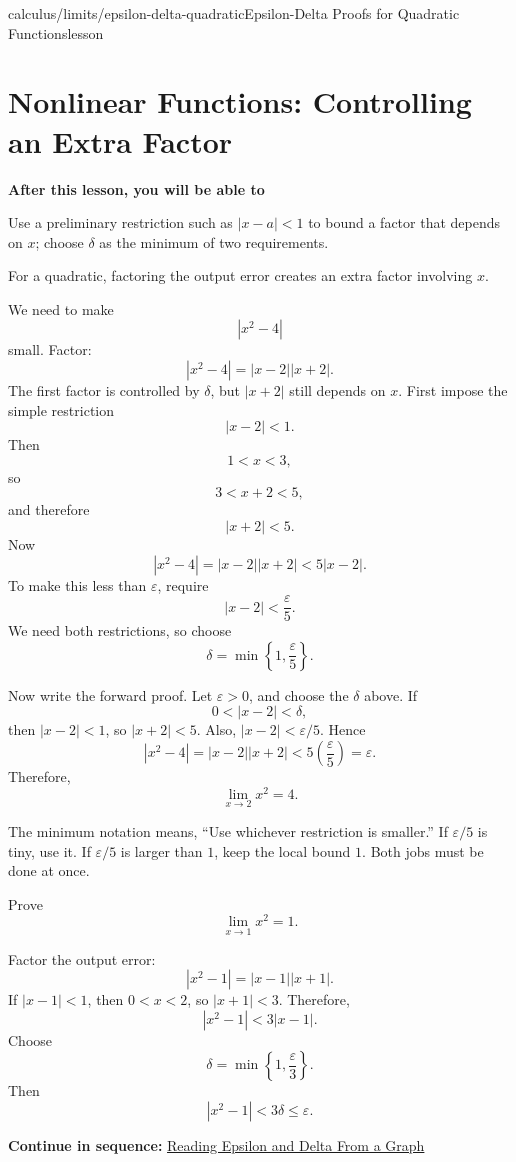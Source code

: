 \documentclass[11pt,openany]{book}
\theoremstyle{bgplain}
\newcounter{bgexample}[chapter]
\newcommand{\webnext}[2]{%
  \par\addvspace{1.2em}\noindent{\color{BGLine}\rule{\textwidth}{0.35pt}}\par\smallskip
  {\small\color{BGGray}\textbf{Continue in sequence:} \hyperlink{web:#1}{#2}}\par
}
\newcommand{\lessonobjective}[1]{%
  \par\Needspace{4\baselineskip}\addvspace{0.6em}%
  {\bfseries\color{BGInk}After this lesson, you will be able to}\par\smallskip
  #1\par\addvspace{0.5em}%
}
\newcommand{\eps}{\varepsilon}
\begin{document}
\begin{webpage}{calculus/limits/epsilon-delta-quadratic}{Epsilon-Delta Proofs for Quadratic Functions}{lesson}
\section{Nonlinear Functions: Controlling an Extra Factor}

\lessonobjective{
Use a preliminary restriction such as \(|x-a|<1\) to bound a factor that depends on \(x\); choose \(\delta\) as the minimum of two requirements.
}

For a quadratic, factoring the output error creates an extra factor involving \(x\).

\begin{bgexample}[title={Prove \(\lim_{x\to2}x^2=4\)}]
\begin{bgsolution}
We need to make
\[
  |x^2-4|
\]
small. Factor:
\[
  |x^2-4|=|x-2||x+2|.
\]
The first factor is controlled by \(\delta\), but \(|x+2|\) still depends on \(x\). First impose the simple restriction
\[
  |x-2|<1.
\]
Then
\[
  1<x<3,
\]
so
\[
  3<x+2<5,
\]
and therefore
\[
  |x+2|<5.
\]
Now
\[
  |x^2-4|=|x-2||x+2|<5|x-2|.
\]
To make this less than \(\eps\), require
\[
  |x-2|<\frac\eps5.
\]
We need both restrictions, so choose
\[
  \boxed{\delta=\min\left\{1,\frac\eps5\right\}}.
\]

Now write the forward proof. Let \(\eps>0\), and choose the \(\delta\) above. If
\[
  0<|x-2|<\delta,
\]
then \(|x-2|<1\), so \(|x+2|<5\). Also, \(|x-2|<\eps/5\). Hence
\[
  |x^2-4|
  =|x-2||x+2|
  <5\left(\frac\eps5\right)
  =\eps.
\]
Therefore,
\[
  \boxed{\lim_{x\to2}x^2=4}.
\]
\end{bgsolution}
\end{bgexample}

\begin{bgconcept}
The minimum notation means, ``Use whichever restriction is smaller.'' If \(\eps/5\) is tiny, use it. If \(\eps/5\) is larger than \(1\), keep the local bound \(1\). Both jobs must be done at once.
\end{bgconcept}

\begin{bgexample}[title={A shifted square}]
Prove
\[
  \lim_{x\to1}x^2=1.
\]

\begin{bgsolution}
Factor the output error:
\[
  |x^2-1|=|x-1||x+1|.
\]
If \(|x-1|<1\), then \(0<x<2\), so \(|x+1|<3\). Therefore,
\[
  |x^2-1|<3|x-1|.
\]
Choose
\[
  \boxed{\delta=\min\left\{1,\frac\eps3\right\}}.
\]
Then
\[
  |x^2-1|<3\delta\le\eps.
\]
\end{bgsolution}
\end{bgexample}
\webnext{calculus/limits/epsilon-delta-graph}{Reading Epsilon and Delta From a Graph}
\end{webpage}
\end{document}
